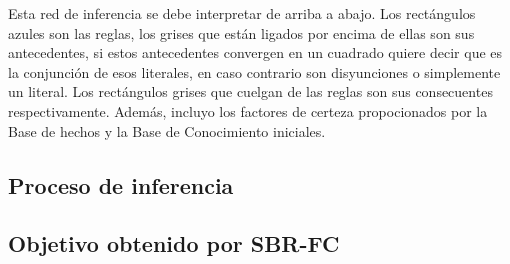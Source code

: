 \begin{center}
\end{center}

\break

\par Esta red de inferencia se debe interpretar de arriba a abajo.
Los rectángulos azules son las reglas, los grises que están ligados por encima 
de ellas son sus antecedentes, si estos antecedentes convergen en un cuadrado 
quiere decir que es la conjunción de esos literales, en caso contrario son disyunciones
o simplemente un literal. Los rectángulos grises que cuelgan de las reglas 
son sus consecuentes respectivamente. Además, incluyo los factores de certeza propocionados por
la Base de hechos y la Base de Conocimiento iniciales.
\subsection{Proceso de inferencia}

\subsection{Objetivo obtenido por SBR-FC}

